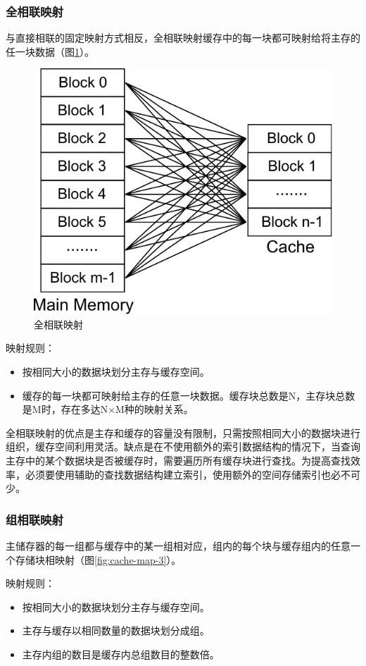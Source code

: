 \subsubsection{全相联映射}

与直接相联的固定映射方式相反，全相联映射缓存中的每一块都可映射给将主存的任一块数据（图\ref{fig:cache-map-2}）。

\begin{figure}[!htb]
\centering
\includegraphics[width=0.4\linewidth]{./graph/cache-map-2}
\caption{全相联映射}
\label{fig:cache-map-2}
\end{figure}

映射规则：
\begin{itemize}
\item 按相同大小的数据块划分主存与缓存空间。
\item 缓存的每一块都可映射给主存的任意一块数据。缓存块总数是N，主存块总数是M时，存在多达N×M种的映射关系。
\end{itemize}

全相联映射的优点是主存和缓存的容量没有限制，只需按照相同大小的数据块进行组织，缓存空间利用灵活。缺点是在不使用额外的索引数据结构的情况下，当查询主存中的某个数据块是否被缓存时，需要遍历所有缓存块进行查找。为提高查找效率，必须要使用辅助的查找数据结构建立索引，使用额外的空间存储索引也必不可少。

\subsubsection{组相联映射}

主储存器的每一组都与缓存中的某一组相对应，组内的每个块与缓存组内的任意一个存储块相映射（图\ref{fig:cache-map-3}）。

映射规则：
\begin{itemize}
\item 按相同大小的数据块划分主存与缓存空间。
\item 主存与缓存以相同数量的数据块划分成组。
\item 主存内组的数目是缓存内总组数目的整数倍。
\end{itemize}

